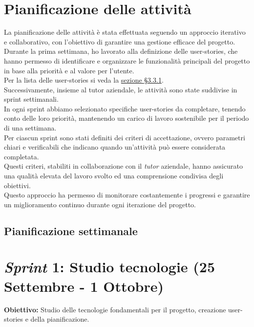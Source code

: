 \section{Pianificazione delle attività}
\label{sez:pianificazione-attivita}

La pianificazione delle attività è stata effettuata seguendo un approccio iterativo e collaborativo, con l'obiettivo di garantire una gestione efficace del progetto.\\
Durante la prima settimana, ho lavorato alla definizione delle \gls{user-stories}, che hanno permesso di identificare e organizzare le funzionalità principali del progetto in base alla priorità e al valore per l’utente.\\
Per la lista delle \gls{user-stories} si veda la {\hyperref[subsubsec:epic-stories]{sezione §3.3.1}}.\\

\noindent Successivamente, insieme al tutor aziendale, le attività sono state suddivise in \gls{sprint} settimanali.\\
In ogni \gls{sprint} abbiamo selezionato specifiche \gls{user-stories} da completare, tenendo conto delle loro priorità, mantenendo un carico di lavoro sostenibile per il periodo di una settimana. \\
Per ciascun \gls{sprint} sono stati definiti dei criteri di accettazione, ovvero parametri chiari e verificabili che indicano quando un'attività può essere considerata completata. \\
Questi criteri, stabiliti in collaborazione con il \textit{tutor} aziendale, hanno assicurato una qualità elevata del lavoro svolto ed una comprensione condivisa degli obiettivi. \\
Questo approccio ha permesso di monitorare costantemente i progressi e garantire un miglioramento continuo durante ogni iterazione del progetto.


\pagebreak
\subsection{Pianificazione settimanale}
\label{sez:pianificazione-settimanale}

\section*{\textit{Sprint} 1: Studio tecnologie (25 Settembre - 1 Ottobre)}
\textbf{Obiettivo:} Studio delle tecnologie fondamentali per il progetto, creazione \gls{user-stories} e della pianificazione.\\  

